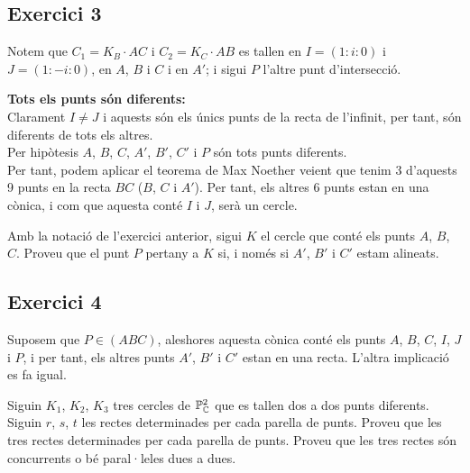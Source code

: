 \documentclass[11pt, a4paper]{article}
\begin{document}
\subsection{Exercici 3}
Notem que $C_1=K_B\cdot AC$ i $C_2=K_C\cdot AB$ es tallen en $I=(1:i:0)$ i $J=(1:-i:0)$, en $A$, $B$ i $C$ i en $A'$; i sigui $P$ l'altre punt d'intersecció.\par
\textbf{Tots els punts són diferents:}\\
Clarament $I\neq J$ i aquests són els únics punts de la recta de l'infinit, per tant, són diferents de tots els altres.\\
Per hipòtesis $A$, $B$, $C$, $A'$, $B'$, $C'$ i $P$ són tots punts diferents.\\ 
Per tant, podem aplicar el teorema de Max Noether veient que tenim $3$ d'aquests 9 punts en la recta $BC$ ($B$, $C$ i $A'$). Per tant, els altres 6 punts estan en una cònica, i com que aquesta conté $I$ i $J$, serà un cercle.\\
\newpage
\begin{tcolorbox}[title=\section{Exercici 4}]
    Amb la notació de l'exercici anterior, sigui $K$ el cercle que conté els punts $A$, $B$, $C$. Proveu que el punt $P$ pertany a $K$ si, i només si $A'$, $B'$ i $C'$ estam alineats.
\end{tcolorbox}
\subsection{Exercici 4}
Suposem que $P\in (ABC)$, aleshores aquesta cònica conté els punts $A$, $B$, $C$, $I$, $J$ i $P$, i per tant, els altres punts $A'$, $B'$ i $C'$ estan en una recta. L'altra implicació es fa igual.
\newpage
\begin{tcolorbox}[title=\section{Exercici 5}]
Siguin $K_1$, $K_2$, $K_3$ tres cercles de $\mathbb P^2_\mathbb C$ que es tallen dos a dos punts diferents. Siguin $r$, $s$, $t$ les rectes determinades per cada parella de punts. Proveu que les tres rectes determinades per cada parella de punts. Proveu que les tres rectes són concurrents o bé paral·leles dues a dues.
\end{tcolorbox}
\end{document}
